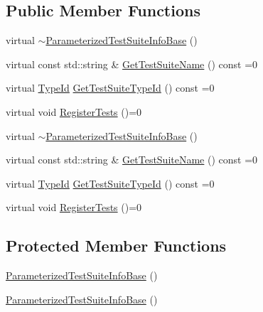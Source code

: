 \subsection*{Public Member Functions}
\begin{DoxyCompactItemize}
\item 
virtual \mbox{\hyperlink{classtesting_1_1internal_1_1_parameterized_test_suite_info_base_ac2aa0664f56e84cacab823d345c7d67b}{$\sim$\+Parameterized\+Test\+Suite\+Info\+Base}} ()
\item 
virtual const std\+::string \& \mbox{\hyperlink{classtesting_1_1internal_1_1_parameterized_test_suite_info_base_aa6e36241431dc72c251ecee9b637b4d3}{Get\+Test\+Suite\+Name}} () const =0
\item 
virtual \mbox{\hyperlink{namespacetesting_1_1internal_a38c435cbab5f8b784e2e7f3356cab242}{Type\+Id}} \mbox{\hyperlink{classtesting_1_1internal_1_1_parameterized_test_suite_info_base_ac5bcbf8c50a44472d697e0c80b54387d}{Get\+Test\+Suite\+Type\+Id}} () const =0
\item 
virtual void \mbox{\hyperlink{classtesting_1_1internal_1_1_parameterized_test_suite_info_base_a41d7d663014af0c1e614c5a61293cb5a}{Register\+Tests}} ()=0
\item 
virtual \mbox{\hyperlink{classtesting_1_1internal_1_1_parameterized_test_suite_info_base_ac2aa0664f56e84cacab823d345c7d67b}{$\sim$\+Parameterized\+Test\+Suite\+Info\+Base}} ()
\item 
virtual const std\+::string \& \mbox{\hyperlink{classtesting_1_1internal_1_1_parameterized_test_suite_info_base_aa6e36241431dc72c251ecee9b637b4d3}{Get\+Test\+Suite\+Name}} () const =0
\item 
virtual \mbox{\hyperlink{namespacetesting_1_1internal_a38c435cbab5f8b784e2e7f3356cab242}{Type\+Id}} \mbox{\hyperlink{classtesting_1_1internal_1_1_parameterized_test_suite_info_base_ac5bcbf8c50a44472d697e0c80b54387d}{Get\+Test\+Suite\+Type\+Id}} () const =0
\item 
virtual void \mbox{\hyperlink{classtesting_1_1internal_1_1_parameterized_test_suite_info_base_a41d7d663014af0c1e614c5a61293cb5a}{Register\+Tests}} ()=0
\end{DoxyCompactItemize}
\subsection*{Protected Member Functions}
\begin{DoxyCompactItemize}
\item 
\mbox{\hyperlink{classtesting_1_1internal_1_1_parameterized_test_suite_info_base_a3b50ae419b0de858f3ad9b8dd49989de}{Parameterized\+Test\+Suite\+Info\+Base}} ()
\item 
\mbox{\hyperlink{classtesting_1_1internal_1_1_parameterized_test_suite_info_base_a3b50ae419b0de858f3ad9b8dd49989de}{Parameterized\+Test\+Suite\+Info\+Base}} ()
\end{DoxyCompactItemize}
